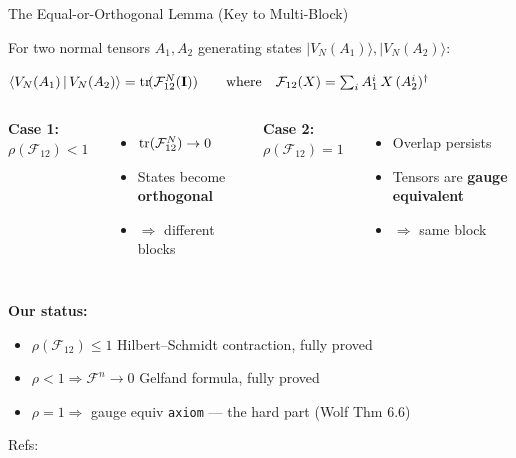 \documentclass[aspectratio=169,10pt]{beamer}
\begin{document}
\begin{frame}{The Equal-or-Orthogonal Lemma (Key to Multi-Block)}
    \vspace{-0.5em}

    {\small For two normal tensors $A_1, A_2$ generating states $|V_N(A_1)\rangle,  |V_N(A_2)\rangle$:}

    \vspace{0.2em}
    \begin{center}
    \colorbox{cardbg}{\parbox{0.85\textwidth}{\centering
    $
    \langle V_N(A_1)\,|\,V_N(A_2)\rangle = 
    \mathrm{tr}\!(\mathcal{F}_{12}^N(\mathbf{I}))
    \qquad\text{where}\quad
    \mathcal{F}_{12}(X) = \sum_i A_1^i\, X\, (A_2^i)^\dagger
    $}}
    \end{center}

    \vspace{0.3em}
    \begin{columns}[T]
        \textbf{Case 1:} $\rho(\mathcal{F}_{12}) < 1$
        \begin{itemize}\small
            \item $\mathrm{tr}(\mathcal{F}_{12}^N) \to 0$
            \item States become \textbf{\textcolor{leanblue}{orthogonal}}
            \item $\Rightarrow$ different blocks
        \end{itemize}

        \textbf{Case 2:} $\rho(\mathcal{F}_{12}) = 1$
        \begin{itemize}\small
            \item Overlap persists
            \item Tensors are \textbf{\textcolor{leangreen}{gauge equivalent}}
            \item $\Rightarrow$ same block
        \end{itemize}
    \end{columns}

    \vspace{0.3em}
    {\small \textbf{Our status:}}
    \begin{itemize}\itemsep0.05em\small
        \item[\textcolor{leangreen}{\checkmark}] $\rho(\mathcal{F}_{12}) \leq 1$ \hfill{\tiny Hilbert--Schmidt contraction, fully proved}
        \item[\textcolor{leangreen}{\checkmark}] $\rho < 1 \Rightarrow \mathcal{F}^n\to 0$ \hfill{\tiny Gelfand formula, fully proved}
        \item[\textcolor{softred}{$\boldsymbol\times$}] $\rho = 1 \Rightarrow$ gauge equiv \hfill{\tiny \textcolor{softred}{\texttt{axiom}} --- the hard part (Wolf Thm 6.6)}
    \end{itemize}

    \vspace{0.15em}
    {\footnotesize \textcolor{dimwhite}{Refs:~\cite{Perez-Garcia2007Matrix,Wolf2012Quantum}}}
\end{frame}
\end{document}
